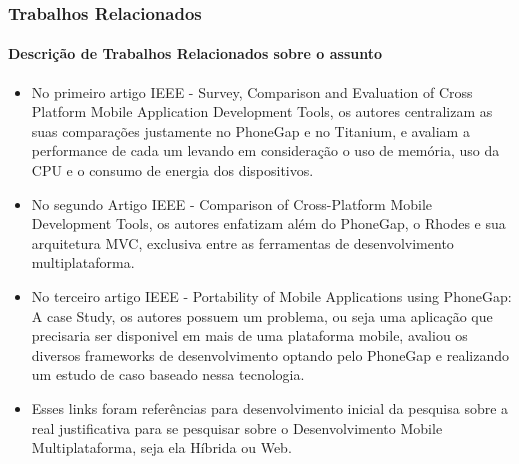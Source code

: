 \documentclass[10pt]{beamer}
\begin{document}
\begin{frame}
	\frametitle{Trabalhos Relacionados}
	\framesubtitle{Descrição de Trabalhos Relacionados sobre o assunto}
	\begin{itemize}
			\item No primeiro artigo IEEE - Survey, Comparison and Evaluation of Cross Platform Mobile Application Development Tools, os autores centralizam as suas comparações justamente no PhoneGap e no Titanium, e avaliam a performance de cada um levando em consideração o uso de memória, uso da CPU e o consumo de energia dos dispositivos.
			\item No segundo Artigo IEEE - Comparison of Cross-Platform Mobile Development Tools, os autores enfatizam além do PhoneGap, o Rhodes e sua arquitetura MVC, exclusiva entre as ferramentas de desenvolvimento multiplataforma.
			\item No terceiro artigo IEEE - Portability of Mobile Applications using PhoneGap: A case Study, os autores possuem um problema, ou seja uma aplicação que precisaria ser disponivel em mais de uma plataforma mobile, avaliou os diversos frameworks de desenvolvimento optando pelo PhoneGap e realizando um estudo de caso baseado nessa tecnologia.
			\item Esses links foram referências para desenvolvimento inicial da pesquisa sobre a real justificativa para se pesquisar sobre o Desenvolvimento Mobile Multiplataforma, seja ela Híbrida ou Web.
	\end{itemize}
\end{frame}
\end{document}
